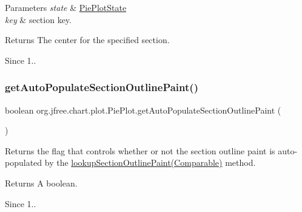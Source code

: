 \begin{DoxyParams}{Parameters}
{\em state} & \mbox{\hyperlink{classorg_1_1jfree_1_1chart_1_1plot_1_1_pie_plot_state}{Pie\+Plot\+State}} \\
\hline
{\em key} & section key.\\
\hline
\end{DoxyParams}
\begin{DoxyReturn}{Returns}
The center for the specified section.
\end{DoxyReturn}
\begin{DoxySince}{Since}
1.. 
\end{DoxySince}
\mbox{\label{classorg_1_1jfree_1_1chart_1_1plot_1_1_pie_plot_ad11b37f9c00a5465c12b2dab8570831f}} 
\subsubsection{\texorpdfstring{get\+Auto\+Populate\+Section\+Outline\+Paint()}{getAutoPopulateSectionOutlinePaint()}}
{\footnotesize\ttfamily boolean org.\+jfree.\+chart.\+plot.\+Pie\+Plot.\+get\+Auto\+Populate\+Section\+Outline\+Paint (\begin{DoxyParamCaption}{ }\end{DoxyParamCaption})}

Returns the flag that controls whether or not the section outline paint is auto-\/populated by the \mbox{\hyperlink{classorg_1_1jfree_1_1chart_1_1plot_1_1_pie_plot_a313892afd8de6bc0452c5c8c06d076fc}{lookup\+Section\+Outline\+Paint(\+Comparable)}} method.

\begin{DoxyReturn}{Returns}
A boolean.
\end{DoxyReturn}
\begin{DoxySince}{Since}
1.. 
\end{DoxySince}
\mbox{\label{classorg_1_1jfree_1_1chart_1_1plot_1_1_pie_plot_af633b0190782af18b42096b840906423}} 
